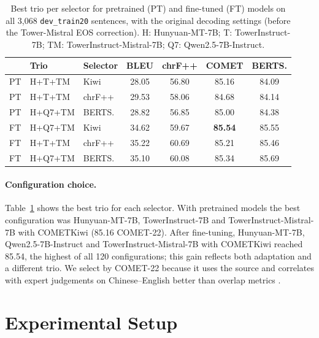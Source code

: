 \documentclass[11pt]{article}
\begin{document}
\begin{table}[t]
\centering
\small
\setlength{\tabcolsep}{3pt}
\begin{tabular}{lllcccc}
\toprule
 & Trio & Selector & BLEU & chrF++ & COMET & BERTS. \\
\midrule
PT & H+T+TM  & Kiwi   & 28.05 & 56.80 & 85.16 & 84.09 \\
PT & H+T+TM  & chrF++ & 29.53 & 58.06 & 84.68 & 84.14 \\
PT & H+Q7+TM & BERTS. & 28.82 & 56.85 & 85.00 & 84.38 \\
\midrule
FT & H+Q7+TM & Kiwi   & 34.62 & 59.67 & \textbf{85.54} & 85.55 \\
FT & H+T+TM  & chrF++ & 35.22 & 60.69 & 85.21 & 85.46 \\
FT & H+Q7+TM & BERTS. & 35.10 & 60.08 & 85.34 & 85.69 \\
\bottomrule
\end{tabular}
\caption{Best trio per selector for pretrained (PT) and fine-tuned (FT) models on all 3,068 \texttt{dev\_train20} sentences, with the original decoding settings (before the Tower-Mistral EOS correction). H: Hunyuan-MT-7B; T: TowerInstruct-7B; TM: TowerInstruct-Mistral-7B; Q7: Qwen2.5-7B-Instruct.}
\label{tab:dev_ensemble_selection}
\end{table}

\paragraph{Configuration choice.}
Table~\ref{tab:dev_ensemble_selection} shows the best trio for each selector. With pretrained models the best configuration was Hunyuan-MT-7B, TowerInstruct-7B and TowerInstruct-Mistral-7B with COMETKiwi (85.16 COMET-22). After fine-tuning, Hunyuan-MT-7B, Qwen2.5-7B-Instruct and TowerInstruct-Mistral-7B with COMETKiwi reached 85.54, the highest of all 120 configurations; this gain reflects both adaptation and a different trio. We select by COMET-22 because it uses the source and correlates with expert judgements on Chinese--English better than overlap metrics \citep{freitag-etal-2022-results}.

\section{Experimental Setup}
\label{sec:experimental_setup}
\end{document}

